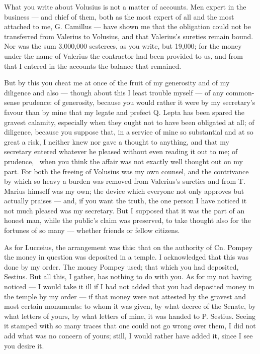  What you write about Volusius is not a matter of accounts. Men expert in the business --- and chief of them, both as the most expert of all and the most attached to me, G. Camillus --- have shown me that the obligation could not be transferred from Valerius to Volusius, and that Valerius's sureties remain bound. Nor was the sum 3{,}000{,}000 sesterces, as you write, but 19{,}000; for the money under the name of Valerius the contractor had been provided to us, and from that I entered in the accounts the balance that remained.

 But by this you cheat me at once of the fruit of my generosity and of my diligence and also --- though about this I least trouble myself --- of any common-sense prudence: of generosity, because you would rather it were by my secretary's favour than by mine that my legate and prefect Q. Lepta has been spared the gravest calamity, especially when they ought not to have been obligated at all; of diligence, because you suppose that, in a service of mine so substantial and at so great a risk, I neither knew nor gave a thought to anything, and that my secretary entered whatever he pleased without even reading it out to me; of prudence, \dag\ when you think the affair was not exactly well thought out on my part. For both the freeing of Volusius was my own counsel, and the contrivance by which so heavy a burden was removed from Valerius's sureties and from T. Marius himself was my own; the device which everyone not only approves but actually praises --- and, if you want the truth, the one person I have noticed it not much pleased was my secretary. But I supposed that it was the part of an honest man, while the public's claim was preserved, to take thought also for the fortunes of so many --- whether friends or fellow citizens.

 As for Lucceius, the arrangement was this: that on the authority of Cn. Pompey the money in question was deposited in a temple. I acknowledged that this was done by my order. The money Pompey used; that which you had deposited, Sestius. But all this, I gather, has nothing to do with you. As for my not having noticed --- I would take it ill if I had not added that you had deposited money in the temple by my order --- if that money were not attested by the gravest and most certain monuments: to whom it was given, by what decree of the Senate, by what letters of yours, by what letters of mine, it was handed to P. Sestius. Seeing it stamped with so many traces that one could not go wrong over them, I did not add what was no concern of yours; still, I would rather have added it, since I see you desire it.

